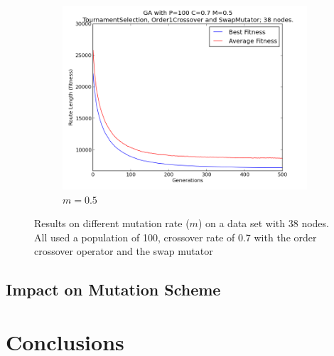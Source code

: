 \documentclass[10pt, a4paper]{article}
\begin{document}
\begin{figure}[h]
\begin{subfigure}[b]{0.67\textwidth}
\includegraphics[width=\textwidth]{img/results/order1crossover/swapmutator/n38p100c07m05}
\caption{$m = 0.5$}
\end{subfigure}
\caption{Results on different mutation rate ($m$) on a data set with 38 nodes.
         All used a population of 100, crossover rate of 0.7 with the order
         crossover operator and the swap mutator}
\label{fig:mutation-rate-results}
\end{figure}


\subsection{Impact on Mutation Scheme}


\section{Conclusions}




\end{document}
